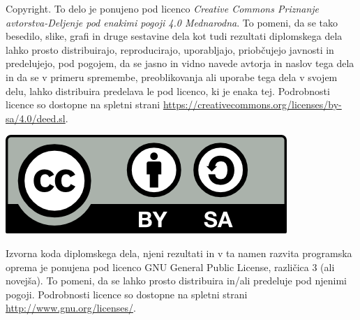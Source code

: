 





{\small \noindent
{\sc Copyright}.
To delo je ponujeno pod licenco
\textit{Creative Commons Priznanje avtorstva-Deljenje pod enakimi pogoji 4.0 Mednarodna}.
To pomeni, da se tako besedilo, slike, grafi in druge sestavine dela kot tudi rezultati
diplomskega dela lahko prosto distribuirajo, reproducirajo, uporabljajo, priobčujejo javnosti
in predelujejo, pod pogojem, da se jasno in vidno navede avtorja in naslov tega dela in da se v
primeru spremembe, preoblikovanja ali uporabe tega dela v svojem delu, lahko distribuira
predelava le pod licenco, ki je enaka tej.
Podrobnosti licence so dostopne na spletni strani
\url{https://creativecommons.org/licenses/by-sa/4.0/deed.sl}.
}

\vspace*{1cm}
\begin{center}
    \includegraphics{cc-by-sa.png}
\end{center}

\vspace*{1cm}
{\small \noindent
    Izvorna koda diplomskega dela, njeni rezultati in v ta namen razvita programska oprema je
    ponujena pod licenco GNU General Public License, različica 3 (ali novejša).
    To pomeni, da se lahko prosto distribuira in/ali predeluje pod njenimi pogoji.
    Podrobnosti licence so dostopne na spletni strani \url{http://www.gnu.org/licenses/}.
}
